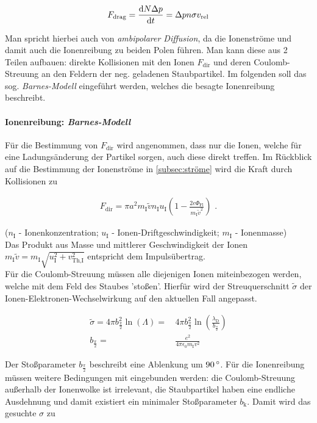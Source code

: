 \documentclass[numbers=noenddot,a4paper]{scrartcl}
\newcommand{\degree}{^\circ}
\newcommand{\diff}{\textnormal{d}}
\newcommand{\ix}[1]{_\text{#1}}
\newcommand{\tilt}[1]{\textit{#1}}
\begin{document}
					\begin{align}
						F\ix{drag}=\frac{\diff N \Delta p}{\diff t}=\Delta p n \sigma v\ix{rel}
					\end{align}
					
				Man spricht hierbei auch von \tilt{ambipolarer Diffusion}, da die Ionenströme und damit auch die Ionenreibung zu beiden Polen führen. Man kann diese aus 2 Teilen aufbauen: direkte Kollisionen mit den Ionen $F\ix{dir}$ und deren Coulomb-Streuung an den Feldern der neg. geladenen Staubpartikel. Im folgenden soll das sog. \tilt{Barnes-Modell} eingeführt werden, welches die besagte Ionenreibung beschreibt.
				
				\paragraph{Ionenreibung: \tilt{Barnes-Modell}}
				
				Für die Bestimmung von $F\ix{dir}$ wird angenommen, dass nur die Ionen, welche für eine Ladungsänderung der Partikel sorgen, auch diese direkt treffen. Im Rückblick auf die Bestimmung der Ionenströme in \ref{subsec:ströme} wird die Kraft durch Kollisionen zu
				
					\begin{align}
						F\ix{dir}=\pi a^2m\ix{I}\tilde{v}n\ix{I}u\ix{I}\left(1-\frac{2e\Phi\ix{Fl}}{m\ix{I}\tilde{v}^2}\right)\,\,.
					\end{align}
					
				($n\ix{I}$ - Ionenkonzentration; $u\ix{I}$ - Ionen-Driftgeschwindigkeit; $m\ix{I}$ - Ionenmasse)\\
				Das Produkt aus Masse und mittlerer Geschwindigkeit der Ionen $m\ix{I}\tilde{v}=m\ix{I}\sqrt{u\ix{I}^2+v\ix{Th,I}^2}$ entspricht dem Impulsübertrag.\\
				Für die Coulomb-Streuung müssen alle diejenigen Ionen miteinbezogen werden, welche mit dem Feld des Staubes 'stoßen'. Hierfür wird der Streuquerschnitt $\tilde{\sigma}$ der Ionen-Elektronen-Wechselwirkung auf den aktuellen Fall angepasst.
				
					\begin{align}
						\tilde{\sigma}=4\pi b_{\frac{\pi}{2}}^2\ln\left(\Lambda\right)=&\,4\pi b_{\frac{\pi}{2}}^2\ln\left(\frac{\lambda\ix{D}}{b_{\frac{\pi}{2}}}\right) \\
						b_{\frac{\pi}{2}}=&\,\frac{e^2}{4\pi\epsilon\ix{0}m\ix{I}v^2} \nonumber
					\end{align}
					
				Der Stoßparameter $b_{\frac{\pi}{2}}$ beschreibt eine Ablenkung um $\unit[90]{\degree}$. Für die Ionenreibung müssen weitere Bedingungen mit eingebunden werden: die Coulomb-Streuung außerhalb der Ionenwolke ist irrelevant, die Staubpartikel haben eine endliche Ausdehnung und damit existiert ein minimaler Stoßparameter $b\ix{k}$. Damit wird das gesuchte $\sigma$ zu
				
\end{document}
